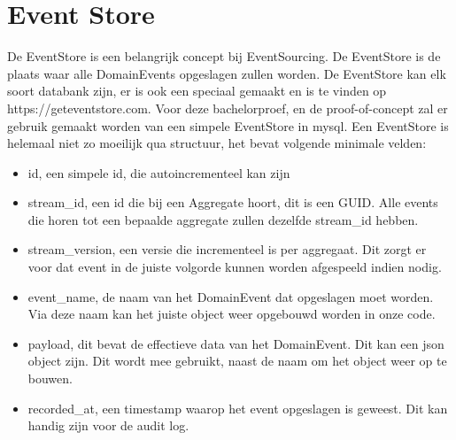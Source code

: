 
\section{Event Store}
\label{sec:event-store}

De EventStore is een belangrijk concept bij EventSourcing. De EventStore is de plaats waar alle DomainEvents opgeslagen zullen worden. De EventStore kan elk soort databank zijn, er is ook een speciaal gemaakt en is te vinden op https://geteventstore.com. Voor deze bachelorproef, en de proof-of-concept zal er gebruik gemaakt worden van een simpele EventStore in mysql. Een EventStore is helemaal niet zo moeilijk qua structuur, het bevat volgende minimale velden:

\begin{itemize}
  \item{id, een simpele id, die autoincrementeel kan zijn}
  \item{stream_id, een id die bij een Aggregate hoort, dit is een GUID. Alle events die horen tot een bepaalde aggregate zullen dezelfde stream_id hebben.}
  \item{stream_version, een versie die incrementeel is per aggregaat. Dit zorgt er voor dat event in de juiste volgorde kunnen worden afgespeeld indien nodig.}
  \item{event_name, de naam van het DomainEvent dat opgeslagen moet worden. Via deze naam kan het juiste object weer opgebouwd worden in onze code.}
  \item{payload, dit bevat de effectieve data van het DomainEvent. Dit kan een json object zijn. Dit wordt mee gebruikt, naast de naam om het object weer op te bouwen.}
  \item{recorded_at, een timestamp waarop het event opgeslagen is geweest. Dit kan handig zijn voor de audit log.}
\end{itemize}
